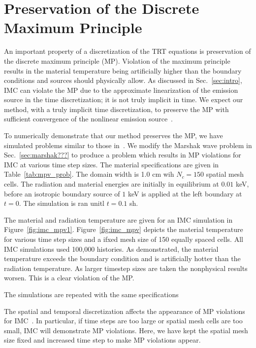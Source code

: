 
\section{Preservation of the Discrete Maximum Principle}

An important property of a discretization of the TRT equations is preservation of the
discrete maximum principle (MP).  Violation of the maximum principle results in
the material temperature being artificially higher than the boundary conditions and
sources should physically allow. As discussed in Sec.~\ref{sec:intro}, IMC can violate the MP due to the approximate
linearization of the emission source in the time discretization; it is not truly implicit in time. 
We expect our
method, with a truly implicit time discretization, to preserve the MP with sufficient
convergence of the nonlinear emission source~\cite{larsen_mpv}.

To numerically demonstrate that our method preserves the MP, we have simulated problems similar to those in~\cite{wollaber2013discrete}.
We modify the Marshak wave problem in Sec.~\ref{sec:marshak???} to produce a problem which
results in MP violations for IMC at various time step sizes.  The material specifications
are given in Table~\ref{tab:mpv_prob}. The domain width is 1.0 cm wih $N_c=150$ spatial mesh cells.  The radiation and material energies are initially in
equilibrium at $0.01$ keV, before an isotropic boundary source of $1$ keV is applied at
the left boundary at $t=0$. The simulation is ran unitl $t=0.1$ sh. 

The material and radiation temperature are given for an IMC simulation in Figure~\ref{fig:imc_mpv1}.  Figure~\ref{fig:imc_mpv} depicts the material temperature for various time step sizes and a ifxed
mesh size of 150 equally spaced cells. All IMC simulations used 100,000 histories. As demonstrated, the material temperature exceeds the boundary condition and is artificially hotter than the radiation temperature.  As larger timestep sizes are taken the nonphysical results worsen.  This is a clear violation of the MP.

The simulations are repeated with the same specifications





The spatial and temporal discretization affects the appearance of MP violations for
IMC~\cite{wollaber2013discrete}. In particular, if time steps are too large or spatial
mesh cells are too small, IMC will demonstrate MP violations.  Here, we have kept the
spatial mesh size fixed and increased time step to make MP violations appear.

